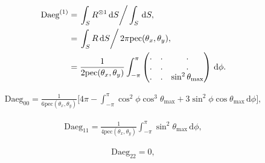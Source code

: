 \documentclass[a4paper,11pt,twoside,openright]{book}
\providecommand{\pec}{{\mathrm{pec}}}%
\def\lthtmlcheckvsize{\ifdim\ht\sizebox<\vsize 
  \ifdim\wd\sizebox<\hsize\expandafter\hfill\fi \expandafter\vfill
  \else\expandafter\vss\fi}%
\begin{document}
{\newpage\clearpage
\setcounter{equation}{62}
%
\begin{subequations}\begin{align}
\textrm{Daeg}^{(1)}&= \left. \int_S R^{\otimes 1} \,\mathrm{d}S \right / \int_S \,\mathrm{d}S , \\
&= \left. \int_S R \,\mathrm{d}S \right / 2\pi \pec (\theta_x , \theta_y ) , \\
&= \frac{1}{2\pec (\theta_x , \theta_y )}
\int_{-\pi}^{\pi}
\begin{pmatrix}
. & . & . \\
. & . & . \\
. & . & \sin^2\theta_{\textrm{max}}\\
\end{pmatrix}
\,\mathrm{d}\phi .
\end{align}\end{subequations}%
\lthtmldisplayZ
\lthtmlcheckvsize\clearpage}

{\newpage\clearpage
\setcounter{equation}{63}
%
\begin{subequations}\begin{flalign}
&\textrm{Daeg}_{00} = \frac{1}{6\pec (\theta_x , \theta_y )} \Bigg[
4\pi -
\int_{-\pi}^{\pi}
\cos^2\phi \cos^3\theta_{\textrm{max}}+ 3\sin^2\phi \cos\theta_{\textrm{max}}
\,\mathrm{d}\phi
\Bigg] , &
\end{flalign}\end{subequations}%
\lthtmldisplayZ
\lthtmlcheckvsize\clearpage}

{\newpage\clearpage
\setcounter{equation}{63}
%
\begin{subequations}\begin{flalign}
&\textrm{Daeg}_{11} = \frac{1}{4\pec (\theta_x , \theta_y )}
\int_{-\pi}^{\pi}
\sin^2\theta_{\textrm{max}}
\,\mathrm{d}\phi
, &
\end{flalign}\end{subequations}%
\lthtmldisplayZ
\lthtmlcheckvsize\clearpage}

{\newpage\clearpage
\setcounter{equation}{63}
%
\begin{subequations}\begin{flalign}
&\textrm{Daeg}_{22} = 0 , &
\end{flalign}\end{subequations}%
\lthtmldisplayZ
\lthtmlcheckvsize\clearpage}
\end{document}
